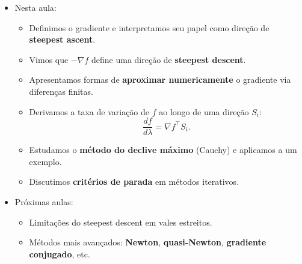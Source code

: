 \documentclass[9pt,a4paper]{extarticle}
\begin{document}
\begin{itemize}
    \item Nesta aula:
    \begin{itemize}
        \item Definimos o gradiente e interpretamos seu papel como direção de \textbf{steepest ascent}.
        \item Vimos que $-\nabla f$ define uma direção de \textbf{steepest descent}.
        \item Apresentamos formas de \textbf{aproximar numericamente} o gradiente via diferenças finitas.
        \item Derivamos a taxa de variação de $f$ ao longo de uma direção $S_i$:
        \[
          \frac{df}{d\lambda} = \nabla f^\top S_i.
        \]
        \item Estudamos o \textbf{método do declive máximo} (Cauchy) e aplicamos a um exemplo.
        \item Discutimos \textbf{critérios de parada} em métodos iterativos.
    \end{itemize}
    \item Próximas aulas:
    \begin{itemize}
        \item Limitações do steepest descent em vales estreitos.
        \item Métodos mais avançados: \textbf{Newton}, \textbf{quasi-Newton}, \textbf{gradiente conjugado}, etc.
    \end{itemize}
\end{itemize}
\end{document}
